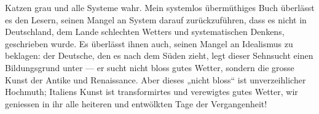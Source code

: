Katzen grau und alle Systeme wahr. Mein systemlos übermüthiges Buch überlässt es den Lesern, seinen Mangel an System darauf zurückzuführen, dass es nicht in Deutschland, dem Lande schlechten Wetters und systematischen Denkens, geschrieben wurde. Es überlässt ihnen auch, seinen Mangel an Idealismus zu beklagen: der Deutsche, den es nach dem Süden zieht, legt dieser Sehnsucht einen Bildungsgrund unter — er sucht nicht bloss gutes Wetter, sondern die grosse Kunst der Antike und Renaissance. Aber dieses „nicht bloss“ ist unverzeihlicher Hochmuth; Italiens Kunst ist transformirtes und verewigtes gutes Wetter, wir geniessen in ihr alle heiteren und entwölkten Tage der Vergangenheit!
\par

